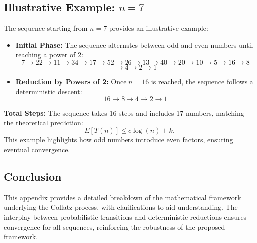 \subsection{Illustrative Example: \( n = 7 \)}
The sequence starting from \( n = 7 \) provides an illustrative example:
\begin{itemize}
    \item \textbf{Initial Phase:} The sequence alternates between odd and even numbers until reaching a power of 2:
    \[
    7 \rightarrow 22 \rightarrow 11 \rightarrow 34 \rightarrow 17 \rightarrow 52 \rightarrow 26 \rightarrow 13 \rightarrow 40 \rightarrow 20 \rightarrow 10 \rightarrow 5 \rightarrow 16 \rightarrow 8 \]
    \[
    \rightarrow 4 \rightarrow 2 \rightarrow 1
    \]
    \item \textbf{Reduction by Powers of 2:} Once \( n = 16 \) is reached, the sequence follows a deterministic descent:
    \[
    16 \rightarrow 8 \rightarrow 4 \rightarrow 2 \rightarrow 1
    \]
\end{itemize}
\textbf{Total Steps:} The sequence takes 16 steps and includes 17 numbers, matching the theoretical prediction:
\[
E[T(n)] \leq c \log(n) + k.
\]
This example highlights how odd numbers introduce even factors, ensuring eventual convergence.

\subsection{Conclusion}
This appendix provides a detailed breakdown of the mathematical framework underlying the Collatz process, with clarifications to aid understanding. The interplay between probabilistic transitions and deterministic reductions ensures convergence for all sequences, reinforcing the robustness of the proposed framework.
